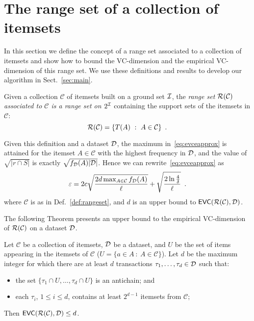 \section{The range set of a collection of itemsets}\label{sec:range}
In this section we define the concept of a range set associated to a
collection of itemsets and show how to bound the VC-dimension and the
empirical VC-dimension of this range set. We use these definitions and results
to develop our algorithm in Sect.~\ref{sec:main}.

\begin{definition}\label{def:rangeset}
Given a collection $\mathcal{C}$ of itemsets built on a ground set ${\cal I}$, the
\emph{range set $\mathcal{R}(\mathcal{C})$ associated to $\mathcal{C}$ is a range
set on $2^{\cal I}$} containing the support sets of the itemsets in $\mathcal{C}$:
\[
	\mathcal{R}(\mathcal{C})=\{T(A) ~:~ A\in\mathcal{C}\}\enspace.
\]
\end{definition}

\begin{fact}\label{fact:maxfreq}
	Given this definition and a dataset ${\cal D}$, the maximum
	in~\eqref{eq:evceapprox} is attained for the itemset $A\in\mathcal{C}$ with the
	highest frequency in ${\cal D}$, and the value of $\sqrt{|r\cap S|}$ is exactly
	$\sqrt{f_{\cal D}(A)|{\cal D}|}$. Hence we can rewrite~\eqref{eq:evceapprox} as
	\begin{equation}\label{eq:evceapproxitemsets}
		\varepsilon = 2c\sqrt{\frac{2d\max_{A\in\mathcal{C}}f_{\cal D}(A)}{\ell}} +
		\sqrt{\frac{2\ln\frac{4}{\delta}}{\ell}}\enspace.
	\end{equation}
	where $\mathcal{C}$ is as in Def.~\ref{def:rangeset}, and $d$ is an
	upper bound to $\mathsf{EVC}(\mathcal{R}(\mathcal{C}),{\cal D})$.
\end{fact}

The following Theorem presents an upper bound to the empirical VC-dimension of
$\mathcal{R}(\mathcal{C})$ on a dataset ${\cal D}$.

\begin{theorem}\label{lem:evcdimupbound}
  Let $\mathcal{C}$ be a collection of itemsets, ${\cal D}$ be a dataset, and $U$ be
  the set of items appearing in the itemsets of $\mathcal{C}$ ($U=\{a\in A ~:~
  A\in\mathcal{C}\}$). Let $d$ be the maximum integer for which there are at
  least $d$ transactions $\tau_1,\dotsc,\tau_d\in {\cal D}$ such that:
  \begin{itemize}
	\item the set $\{\tau_1\cap U,\dotsc,\tau_d\cap U\}$ is an antichain; and
	\item each $\tau_i$, $1\le i\le d$, contains at least $2^{d-1}$ itemsets
		from $\mathcal{C}$;
  \end{itemize}
  Then $\mathsf{EVC}(\mathcal{R}(\mathcal{C}),{\cal D})\le d$.
\end{theorem}

